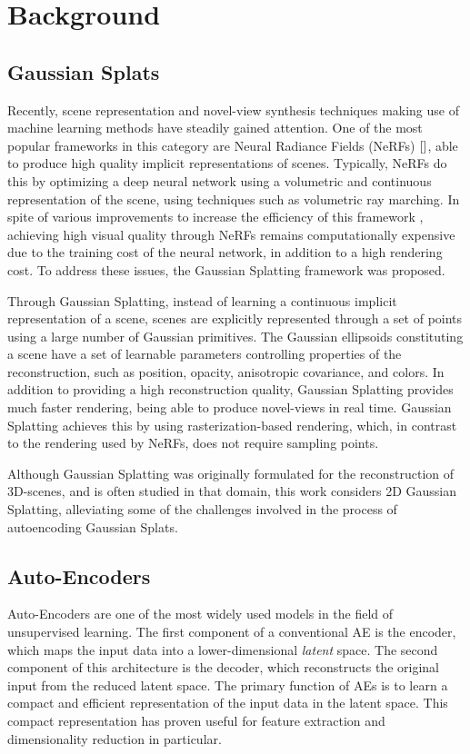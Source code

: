 \section{Background}
\label{sec:background}

\subsection{Gaussian Splats}
\label{bg-Gaussian Splatting}
Recently, scene representation and novel-view synthesis techniques making use of machine learning methods have steadily gained attention. One of the most popular frameworks in this category are Neural Radiance Fields (NeRFs) $\cite{}{}$, able to produce high quality implicit representations of scenes. Typically, NeRFs do this by optimizing a deep neural network using a volumetric and continuous representation of the scene, using techniques such as volumetric ray marching. In spite of various improvements to increase the efficiency of this framework \cite{Mildenhall2020NeRF}, achieving high visual quality through NeRFs remains computationally expensive due to the training cost of the neural network, in addition to a high rendering cost. To address these issues, the Gaussian Splatting framework was proposed.

Through Gaussian Splatting, instead of learning a continuous implicit representation of a scene, scenes are explicitly represented through a set of points using a large number of Gaussian primitives. The Gaussian ellipsoids constituting a scene have a set of learnable parameters controlling properties of the reconstruction, such as position, opacity, anisotropic covariance, and colors. In addition to providing a high reconstruction quality, Gaussian Splatting provides much faster rendering, being able to produce novel-views in real time. Gaussian Splatting achieves this by using rasterization-based rendering, which, in contrast to the rendering used by NeRFs, does not require sampling points.

Although Gaussian Splatting was originally formulated for the reconstruction of 3D-scenes, and is often studied in that domain, this work considers 2D Gaussian Splatting, alleviating some of the challenges involved in the process of autoencoding Gaussian Splats.

\subsection{Auto-Encoders}
\label{bg-ae}
Auto-Encoders \cite{Ballard1987ModularLI} are one of the most widely used models in the field of unsupervised learning. The first component of a conventional AE is the encoder, which maps the input data into a lower-dimensional \textit{latent} space. The second component of this architecture is the decoder, which reconstructs the original input from the reduced latent space. The primary function of AEs is to learn a compact and efficient representation of the input data in the latent space. This compact representation has proven useful for feature extraction and dimensionality reduction \cite{Zabalza2016NovelSS} in particular.

